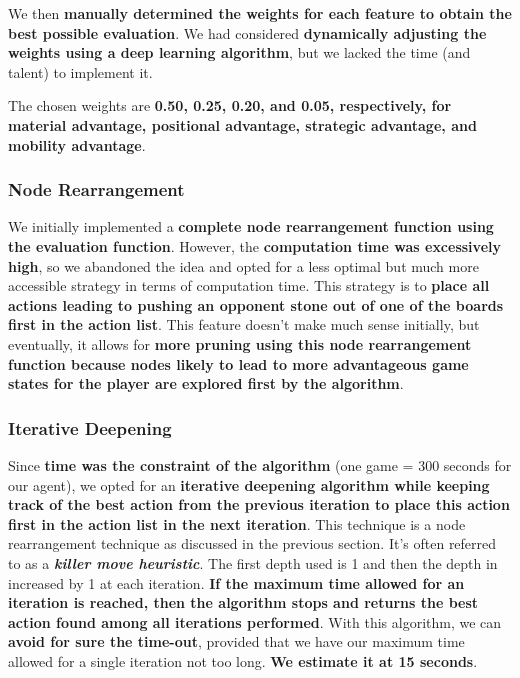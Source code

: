 \documentclass[11pt,a4paper]{report}
\begin{document}
\begin{answers}[23cm]

We then \textbf{manually determined the weights for each feature to obtain the best possible evaluation}. We had considered \textbf{dynamically adjusting the weights using a deep learning algorithm}, but we lacked the time (and talent) to implement it.

The chosen weights are \textbf{0.50, 0.25, 0.20, and 0.05, respectively, for material advantage, positional advantage, strategic advantage, and mobility advantage}.

\subsubsection{Node Rearrangement}

We initially implemented a \textbf{complete node rearrangement function using the evaluation function}. However, the \textbf{computation time was excessively high}, so we abandoned the idea and opted for a less optimal but much more accessible strategy in terms of computation time. This strategy is to \textbf{place all actions leading to pushing an opponent stone out of one of the boards first in the action list}. This feature doesn't make much sense initially, but eventually, it allows for \textbf{more pruning using this node rearrangement function because nodes likely to lead to more advantageous game states for the player are explored first by the algorithm}.

\subsubsection{Iterative Deepening}

Since \textbf{time was the constraint of the algorithm} (one game = 300 seconds for our agent), we opted for an \textbf{iterative deepening algorithm while keeping track of the best action from the previous iteration to place this action first in the action list in the next iteration}. This technique is a node rearrangement technique as discussed in the previous section. It's often referred to as a \textbf{\textit{killer move heuristic}}. The first depth used is 1 and then the depth in increased by 1 at each iteration. \textbf{If the maximum time allowed for an iteration is reached, then the algorithm stops and returns the best action found among all iterations performed}. With this algorithm, we can \textbf{avoid for sure the time-out}, provided that we have our maximum time allowed for a single iteration not too long. \textbf{We estimate it at 15 seconds}.


\end{answers}
\end{document}
